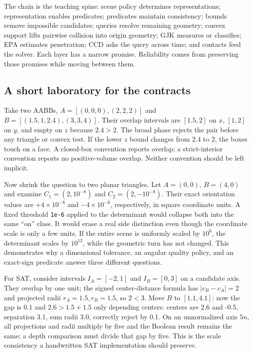 The chain is the teaching spine: scene policy determines representations; representation enables predicates; predicates maintain consistency; bounds remove impossible candidates; queries resolve remaining geometry; convex support lifts pairwise collision into origin geometry; GJK measures or classifies; EPA estimates penetration; CCD asks the query across time; and contacts feed the solver. Each layer has a narrow promise. Reliability comes from preserving those promises while moving between them.

\subsection{A short laboratory for the contracts}\label{03-visual-computing-i-ch020-a-short-laboratory-for-the-contracts}

\hypertarget{03-visual-computing-i-ch020-a-short-laboratory-for-the-contracts}{}

Take two AABBs, \(A=[(0,0,0),(2,2,2)]\) and \(B=[(1.5,1,2.4),(3,3,4)]\). Their overlap intervals are \([1.5,2]\) on \(x\), \([1,2]\) on \(y\), and empty on \(z\) because \(2.4>2\). The broad phase rejects the pair before any triangle or convex test. If the lower \(z\) bound changes from \(2.4\) to \(2\), the boxes touch on a face. A closed-box convention reports overlap; a strict-interior convention reports no positive-volume overlap. Neither convention should be left implicit.

Now shrink the question to two planar triangles. Let \(A=(0,0)\), \(B=(4,0)\) and examine \(C_1=(2,10^{-8})\) and \(C_2=(2,-10^{-8})\). Their exact orientation values are \(+4\times10^{-8}\) and \(-4\times10^{-8}\), respectively, in square coordinate units. A fixed threshold \texttt{1e-6} applied to the determinant would collapse both into the same ``on'' class. It would erase a real side distinction even though the coordinate scale is only a few units. If the entire scene is uniformly scaled by \(10^6\), the determinant scales by \(10^{12}\), while the geometric turn has not changed. This demonstrates why a dimensional tolerance, an angular quality policy, and an exact-sign predicate answer three different questions.

For SAT, consider intervals \(I_A=[-2,1]\) and \(I_B=[0,3]\) on a candidate axis. They overlap by one unit; the signed center-distance formula has \(|c_B-c_A|=2\) and projected radii \(r_A=1.5,r_B=1.5\), so \(2<3\). Move \(B\) to \([1.1,4.1]\): now the gap is \(0.1\) and \(2.6>1.5+1.5\) only depending centers: centers are 2.6 and -0.5, separation 3.1, sum radii 3.0, correctly reject by 0.1. On an unnormalized axis \(5n\), all projections and radii multiply by five and the Boolean result remains the same; a depth comparison must divide that gap by five. This is the scale consistency a handwritten SAT implementation should preserve.

